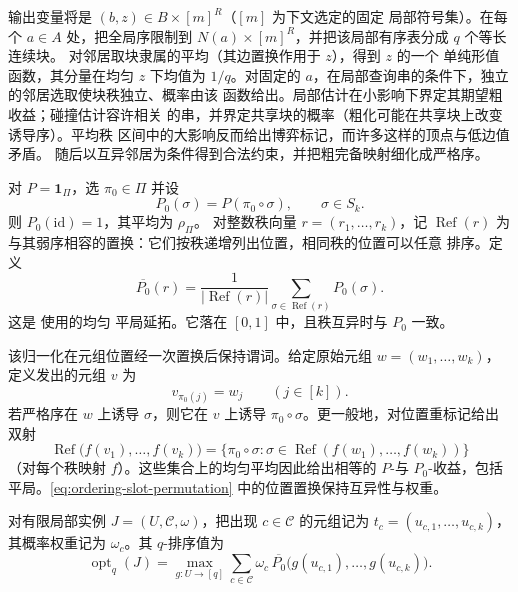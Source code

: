 输出变量将是 \((b,z)\in B\times[m]^R\)（\([m]\) 为下文选定的固定
局部符号集）。在每个 \(a\in A\) 处，把全局序限制到
\(N(a)\times[m]^R\)，并把该局部有序表分成 \(q\) 个等长连续块。
对邻居取块隶属的平均（其边置换作用于 \(z\)），得到 \(z\) 的一个
单纯形值函数，其分量在均匀 \(z\) 下均值为 \(1/q\)。对固定的
\(a\)，在局部查询串的条件下，独立的邻居选取使块秩独立、概率由该
函数给出。局部估计在小影响下界定其期望粗收益；碰撞估计容许相关
的串，并界定共享块的概率（粗化可能在共享块上改变诱导序）。平均秩
区间中的大影响反而给出博弈标记，而许多这样的顶点与低边值矛盾。
随后以互异邻居为条件得到合法约束，并把粗完备映射细化成严格序。

对 \(P=\mathbf1_\Pi\)，选 \(\pi_0\in\Pi\) 并设
\[
 P_0(\sigma)=P(\pi_0\circ\sigma),\qquad \sigma\in S_k.
\]
则 \(P_0(\mathrm{id})=1\)，其平均为 \(\rho_\Pi\)。
对整数秩向量 \(r=(r_1,\ldots,r_k)\)，记 \(\operatorname{Ref}(r)\)
为与其弱序相容的置换：它们按秩递增列出位置，相同秩的位置可以任意
排序。定义
\begin{equation}
 \overline{P_0}(r)=
 \frac1{|\operatorname{Ref}(r)|}
 \sum_{\sigma\in\operatorname{Ref}(r)}P_0(\sigma).
\label{eq:ordering-tie-payoff}
\end{equation}
这是 \cite[Section~8.2]{GuruswamiEtAl2011OrderingCSP} 使用的均匀
平局延拓。它落在 \([0,1]\) 中，且秩互异时与 \(P_0\) 一致。

该归一化在元组位置经一次置换后保持谓词。给定原始元组
\(w=(w_1,\ldots,w_k)\)，定义发出的元组 \(v\) 为
\begin{equation}
 v_{\pi_0(j)}=w_j\qquad(j\in[k]).
\label{eq:ordering-slot-permutation}
\end{equation}
若严格序在 \(w\) 上诱导 \(\sigma\)，则它在 \(v\) 上诱导
\(\pi_0\circ\sigma\)。更一般地，对位置重标记给出双射
\[
 \operatorname{Ref}\bigl(f(v_1),\ldots,f(v_k)\bigr)
 =
 \{\pi_0\circ\sigma:
       \sigma\in\operatorname{Ref}(f(w_1),\ldots,f(w_k))\}
\]
（对每个秩映射 \(f\)）。这些集合上的均匀平均因此给出相等的
\(P\)-与 \(P_0\)-收益，包括平局。\eqref{eq:ordering-slot-permutation}
中的位置置换保持互异性与权重。

对有限局部实例 \(J=(U,\mathcal C,\omega)\)，把出现
\(c\in\mathcal C\) 的元组记为 \(t_c=(u_{c,1},\ldots,u_{c,k})\)，
其概率权重记为 \(\omega_c\)。其 \(q\)-排序值为
\[
 \operatorname{opt}_q(J)=
 \max_{g:U\to[q]}
 \sum_{c\in\mathcal C}\omega_c\,
 \overline{P_0}\bigl(g(u_{c,1}),\ldots,g(u_{c,k})\bigr).
\]

